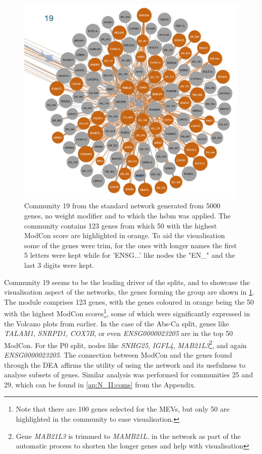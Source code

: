 \begin{figure}[H]    
    \centering
    \includegraphics[width=1.0\textwidth,height=1.0\textheight,keepaspectratio]{Sections/Network_II/resources/non_tum/19_com.png}
    \caption{Community 19 from the standard network generated from 5000 genes, no weight modifier and to which the \acrshort{hsbm} was applied. The community contains 123 genes from which 50 with the highest ModCon score are highlighted in orange. To aid the visualisation some of the genes were trim, for the ones with longer names the first 5 letters were kept while for 'ENSG...' like nodes the "EN\_" and the last 3 digits were kept. }
    \label{fig:N_II:19_com}
\end{figure}


Community 19 seems to be the leading driver of the splits, and to showcase the visualisation aspect of the networks, the genes forming the group are shown in \cref{fig:N_II:19_com}. The module comprises 123 genes, with the genes coloured in orange being the 50 with the highest ModCon scores\footnote{Note that there are 100 genes selected for the MEVs, but only 50 are highlighted in the community to ease visualisation.}, some of which were significantly expressed in the Volcano plots from earlier. In the case of the Abs-Ca split, genes like \textit{TALAM1}, \textit{SNRPD1}, \textit{COX7B}, or even \textit{ENSG0000023205} are in the top 50 ModCon. For the P0 split, nodes like \textit{SNHG25}, \textit{IGFL4}, \textit{MAB21L3}\footnote{Gene \textit{MAB21L3} is trimmed to \textit{MAMB21L.} in the network as part of the automatic process to shorten the longer genes and help with visualisation}, and again \textit{ENSG0000023205}. The connection between ModCon and the genes found through the DEA affirms the utility of using the network and its usefulness to analyse subsets of genes. Similar analysis was performed for communities 25 and 29, which can be found in \cref{ap:N_II:coms} from the Appendix.



